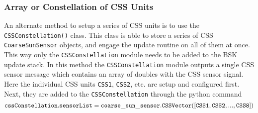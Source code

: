 \subsubsection{Array or Constellation of CSS Units}
An alternate method to setup a series of CSS units is to use the {\tt CSSConstellation()} class.  This class is able to store a series of CSS {\tt CoarseSunSensor} objects, and engage the update routine on all of them at once.  This way only the {\tt CSSConstellation} module needs to be added to the BSK update stack.  In this method the 
{\tt CSSConstellation} module outputs a single CSS sensor message which contains an array of doubles with the CSS sensor signal.  Here the individual CSS units {\tt CSS1}, {\tt CSS2}, etc. are setup and configured first.  Next, they are added to the {\tt CSSConstellation} through the python command
$$
	{\tt cssConstellation.sensorList = coarse\_sun\_sensor.CSSVector([CSS1, CSS2, ..., CSS8])}
$$

